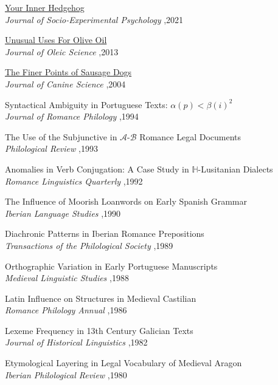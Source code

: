 \documentclass[letterpaper,10pt]{article}
\begin{document}
\begin{etaremune}
\item \href{https://pascalmichaillat.org/hugo-website/papers/paper3/}{Your Inner Hedgehog} \\
\textit{Journal of Socio-Experimental Psychology} \sep 2021
\item \href{https://pascalmichaillat.org/hugo-website/papers/paper1/}{Unusual Uses For Olive Oil} \\
\textit{Journal of Oleic Science} \sep 2013
\item \href{https://pascalmichaillat.org/hugo-website/papers/paper2/}{The Finer Points of Sausage Dogs} \\
\textit{Journal of Canine Science} \sep 2004
\item Syntactical Ambiguity in Portuguese Texts: $\alpha(p)<\beta(i)^2$ \\
\textit{Journal of Romance Philology} \sep 1994
\item The Use of the Subjunctive in $\mathcal{A}$-$\mathcal{B}$ Romance Legal Documents\\
 \textit{Philological Review} \sep 1993
\item Anomalies in Verb Conjugation: A Case Study in $\mathbb{H}$-Lusitanian Dialects\\
\textit{Romance Linguistics Quarterly} \sep 1992
\item The Influence of Moorish Loanwords on Early Spanish Grammar\\
\textit{Iberian Language Studies} \sep 1990
\item Diachronic Patterns in Iberian Romance Prepositions\\
\textit{Transactions of the Philological Society} \sep 1989
\item Orthographic Variation in Early Portuguese Manuscripts\\
\textit{Medieval Linguistic Studies} \sep 1988
\item Latin Influence on Structures in Medieval Castilian\\
\textit{Romance Philology Annual} \sep 1986
\item Lexeme Frequency in 13th Century Galician Texts \\
\textit{Journal of Historical Linguistics} \sep 1982
\item Etymological Layering in Legal Vocabulary of Medieval Aragon \\
\textit{Iberian Philological Review} \sep 1980
\end{etaremune}
\end{document}
